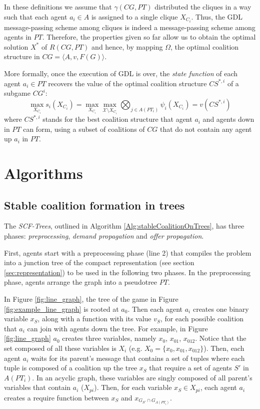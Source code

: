 \documentclass[11pt, twoside, titlepage, a4paper, openright]{report}
\begin{document}
\noindent In these definitions we assume that $\gamma(CG,PT)$ distributed the cliques in a way such that each agent $a_i \in A$ is assigned to a single clique $X_{C_i}$. Thus, the GDL message-passing scheme among cliques is indeed a message-passing scheme among agents in $PT$. 
Therefore, the properties given so far allow us to obtain the optimal solution $X^*$ of $R(CG,PT)$ and hence, by mapping $\Omega$, the optimal coalition structure in $CG=\langle A, v, F(G)\rangle$.

\noindent More formally, once the execution of GDL is over, the \textit{state function} of each agent $a_i \in PT$ recovers the value of the optimal coalition structure $CS^{*,i}$ of a subgame $CG^i$:
\begin{equation}\label{eq:statesolution}
\operatorname*{max}_{X_{C_i}}s_i(X_{C_i})=\operatorname*{max}_{X_{C_i}}\operatorname*{max}_{\mathcal{X}\setminus X_{C_i}}\bigotimes_{j\in A(PT_i)}\psi_i(X_{C_i})=v\left(CS^{*,i}\right)
\end{equation}
where $CS^{*,i}$ stands for the best coalition structure that agent $a_i$ and agents down in $PT$ can form, using a subset of coalitions of $CG$ that do not contain any agent up $a_i$ in $PT$.

\section{Algorithms}

\subsection{Stable coalition formation in trees}

The \textit{SCF-Trees}, outlined in Algorithm \ref{Alg:stableCoalitionOnTrees}, has three phases: \textit{preprocessing}, \textit{demand propagation} and \textit{offer propagation}.

\noindent First, agents start with a preprocessing phase (line 2) that compiles the problem into a junction tree of the compact
representation (see section \ref{sec:representation}) to be used in the
following two phases. In the preprocessing phase, agents arrange the 
graph into a pseudotree $PT$. 

\noindent In Figure \ref{fig:line_graph}, the tree of the game
in Figure \ref{fig:example_line_graph} is rooted at $a_0$. Then each agent $a_i$
creates one binary variable $x_S$, along with a function with its value $v_S$,
for each possible coalition that $a_i$ can join with agents down the tree. For example,
in Figure \ref{fig:line_graph} $a_0$ creates three
variables, namely $x_{0}$, $x_{01}$, $x_{012}$.
Notice that the set composed of all these variables is $X_i$ (e.g. $X_0 =
\{x_{0}, x_{01}, x_{012}\}$). 
Then, each agent $a_i$ waits for its parent's message that contains a set of
tuples where each tuple is composed of a coalition up the tree $x_S$ that
require a set of agents $S'$ in $A(PT_i)$. In an acyclic graph, these variables
are singly composed of all parent's variables that contain $a_i$ ($X_{pi}$).
Then, for each variable $x_S\in X_{pi}$, each agent $a_i$ creates a require
function between $x_S$ and $x_{G_{S'} \cap G_{A(PT_i)}}$. 
\end{document}
